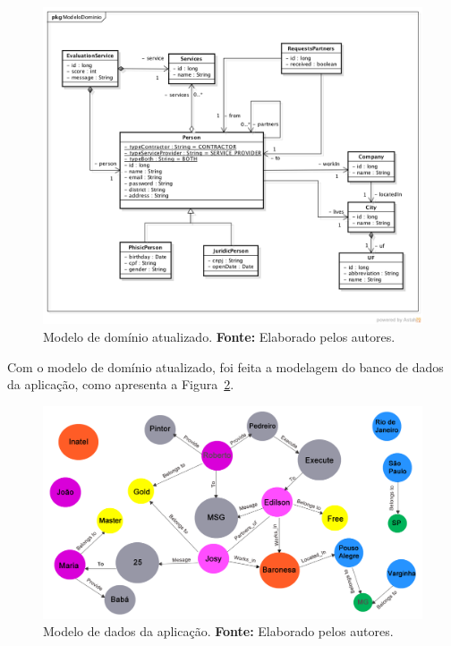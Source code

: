 \begin{figure}[h!]
	\centerline{\includegraphics[scale=0.5]{./imagens/modelo-dominio-com-atributos.png}}
	\caption[Modelo de domínio atualizado]
	{Modelo de domínio atualizado. \textbf{Fonte:} Elaborado pelos autores.}
	\label{fig:modelo_dominio_atualizado}
\end{figure}

Com o modelo de domínio atualizado, foi feita a modelagem do banco de dados da aplicação, como apresenta a Figura~\ref{fig:modelo_dados_aplicacao}.

\begin{figure}[h!]
	\centerline{\includegraphics[scale=0.3]{./imagens/structure-all-nodes.png}}
	\caption[Modelo de dados da aplicação]
	{Modelo de dados da aplicação. \textbf{Fonte:} Elaborado pelos autores.}
	\label{fig:modelo_dados_aplicacao}
\end{figure} 


